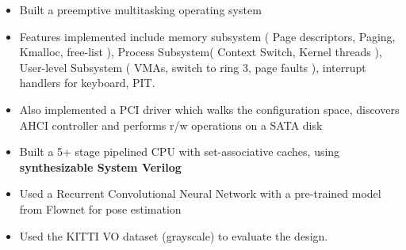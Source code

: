 \documentclass[10pt,a4paper,sans]{moderncv}        %
\begin{document}
{
\vspace{2pt}
\begin{itemize}
\item \small{Built a preemptive multitasking operating system}
\item \small{Features implemented include memory subsystem ( Page descriptors, Paging, Kmalloc, free-list ), Process Subsystem( Context Switch, Kernel threads ), User-level Subsystem ( VMAs, switch to ring 3, page faults ), interrupt handlers for keyboard, PIT.}
\item \small{Also implemented a PCI driver which walks the configuration space, discovers AHCI controller and performs r/w operations on a SATA disk}
\end{itemize}
\vspace{3pt}


\vspace{2pt}
\begin{itemize}
\item\small{Built a 5+ stage pipelined CPU with set-associative caches, using \textbf{synthesizable System Verilog}}
\end{itemize}
\vspace{3pt}

 \vspace{2pt}

 \begin{itemize}
 \item \small{Used a Recurrent Convolutional Neural Network with a pre-trained model from Flownet for pose estimation }
 \item \small{Used the KITTI VO dataset (grayscale) to evaluate the design.}
 \end{itemize}
 \vspace{3pt}





}
\end{document}
